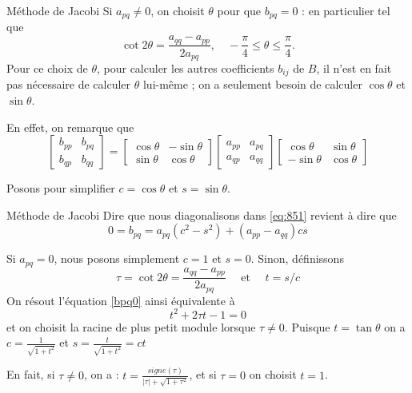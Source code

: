 \documentclass[french, 10pt]{beamer}
\theoremstyle{definition}
\begin{document}
\begin{frame}{Méthode de Jacobi}
	Si $a_{pq} \neq 0$, on choisit $\theta$ pour que $b_{pq} = 0$ : en particulier tel que
	\[
	\cot 2\theta = \frac{a_{qq} - a_{pp}}{2 a_{pq}}, \quad -\frac{\pi}{4} \leq \theta \leq \frac{\pi}{4}.
	\]
	Pour ce choix de $\theta$, pour calculer les autres coefficients $b_{ij}$ de $B$, il n’est en fait pas nécessaire de calculer $\theta$ lui-même ; on a seulement besoin de calculer $\cos \theta$ et $\sin \theta$.
	
	En effet, on remarque que
	\begin{equation}
	\left[\begin{array}{cc}
	b_{pp} & b_{pq} \\
	b_{qp} & b_{qq}
	\end{array}\right]
	=
	\left[\begin{array}{cc}
	\cos \theta & -\sin \theta \\
	\sin \theta & \cos \theta
	\end{array}\right]
	\left[\begin{array}{cc}
	a_{pp} & a_{pq} \\
	a_{qp} & a_{qq}
	\end{array}\right]
	\left[\begin{array}{cc}
	\cos \theta & \sin \theta \\
	-\sin \theta & \cos \theta
	\end{array}\right]
	\label{eq:851}
	\end{equation}
	
	Posons pour simplifier $c = \cos \theta$ et $s = \sin \theta$.
\end{frame}

\begin{frame}{Méthode de Jacobi}
	Dire que nous diagonalisons dans \eqref{eq:851} revient à dire que
	\begin{equation}
	0=b_{p q}=a_{p q}\left(c^2-s^2\right)+\left(a_{p p}-a_{q q}\right) c s
	\label{bpq0}
	\end{equation}
	
	Si $a_{p q}=0$, nous posons simplement $c=1$ et $s=0$. Sinon, définissons
	$$
	\tau=\cot 2\theta =\frac{a_{q q}-a_{p p}}{2 a_{p q}} \quad \text { et } \quad t=s / c
	$$
	On résout l'équation \eqref{bpq0} ainsi équivalente à 
	$$
	t^2+2 \tau t-1=0
	$$
	et on choisit la racine de plus petit module lorsque $\tau \neq 0$. Puisque $t=\tan \theta$ on a $c = \frac{1}{\sqrt{1+t^2}}$ et $s= \frac{t}{\sqrt{1+t^2}}=ct$
	
	
	En fait, si $\tau \neq 0$, on a :
	$
	t=\frac{ signe(\tau)}{|\tau|+ \sqrt{1+\tau^2}}
	$, et si $\tau = 0$ on choisit $t=1$.
\end{frame}
\end{document}
